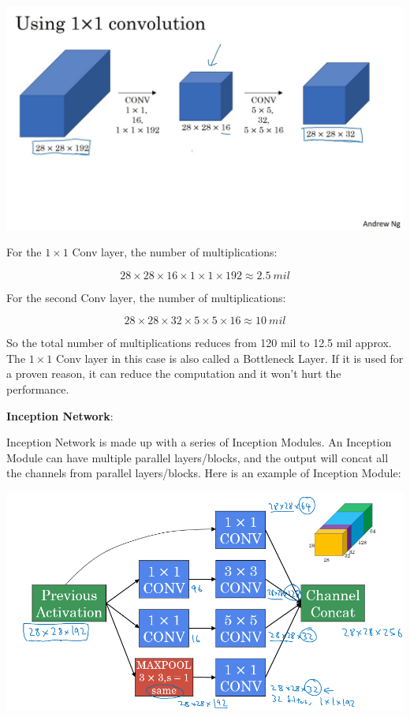 \documentclass{article}
\begin{document}
\begin{center}
\includegraphics[scale=0.2]{./images/inception_reduce.jpg}
\end{center}

\noindent For the \(1 \times 1\) Conv layer, the number of multiplications:

\[28 \times 28 \times 16 \times 1 \times 1 \times 192 \approx 2.5 \ mil\]

\noindent For the second Conv layer, the number of multiplications:

\[28 \times 28 \times 32 \times 5 \times 5 \times 16 \approx 10 \ mil\]

\noindent So the total number of multiplications reduces from 120 mil to 12.5 mil approx. The \(1 \times 1\) Conv layer in this case is also called a Bottleneck Layer. If it is used for a proven reason, it can reduce the computation and it won't hurt the performance.

\bigskip

\noindent \textbf{Inception Network}:

\noindent Inception Network is made up with a series of Inception Modules. An Inception Module can have multiple parallel layers/blocks, and the output will concat all the channels from parallel layers/blocks. Here is an example of Inception Module:

\begin{center}
\includegraphics[scale=0.4]{./images/inception_module.png}
\end{center}
\end{document}
